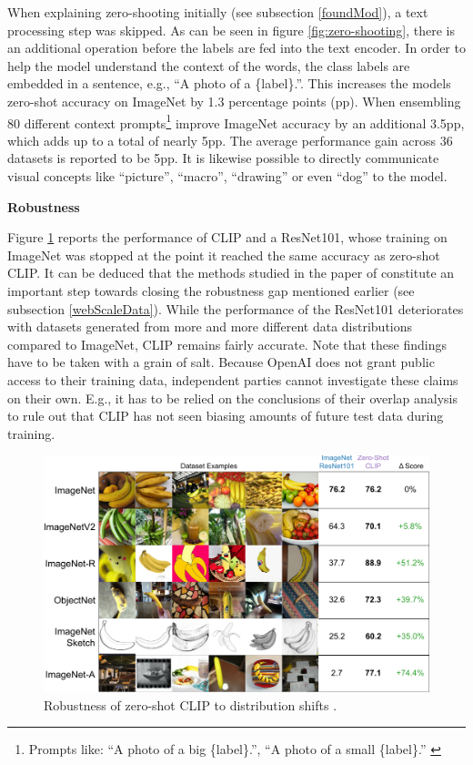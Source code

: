 \documentclass[
]{krantz}
\begin{document}
When explaining zero-shooting initially (see subsection \ref{foundMod}), a text processing step was skipped.
As can be seen in figure \ref{fig:zero-shooting}, there is an additional operation before the labels are fed into the text encoder.
In order to help the model understand the context of the words, the class labels are embedded in a sentence, e.g., ``A photo of a \{label\}.''.
This increases the models zero-shot accuracy on ImageNet by 1.3 percentage points (pp).
When ensembling 80 different context prompts\footnote{Prompts like: ``A photo of a big \{label\}.'', ``A photo of a small \{label\}.'' \citep{radford2021learning}} \citet{radford2021learning} improve ImageNet accuracy by an additional 3.5pp, which adds up to a total of nearly 5pp.
The average performance gain across 36 datasets is reported to be 5pp.
It is likewise possible to directly communicate visual concepts like ``picture'', ``macro'', ``drawing'' or even ``dog'' to the model.

\textbf{Robustness}

Figure \ref{fig:performance-clip} reports the performance of CLIP and a ResNet101, whose training on ImageNet was stopped at the point it reached the same accuracy as zero-shot CLIP.
It can be deduced that the methods studied in the paper of \citet{radford2021learning} constitute an important step towards closing the robustness gap mentioned earlier (see subsection \ref{webScaleData}).
While the performance of the ResNet101 deteriorates with datasets generated from more and more different data distributions compared to ImageNet, CLIP remains fairly accurate.
Note that these findings have to be taken with a grain of salt.
Because OpenAI does not grant public access to their training data, independent parties cannot investigate these claims on their own.
E.g., it has to be relied on the conclusions of their overlap analysis to rule out that CLIP has not seen biasing amounts of future test data during training.

\begin{figure}

{\centering \includegraphics[width=1\linewidth]{figures/02-04-text-support-img/performance-clip} 

}

\caption{Robustness of zero-shot CLIP to distribution shifts \citep{radford2021learning}.}\label{fig:performance-clip}
\end{figure}
\end{document}
